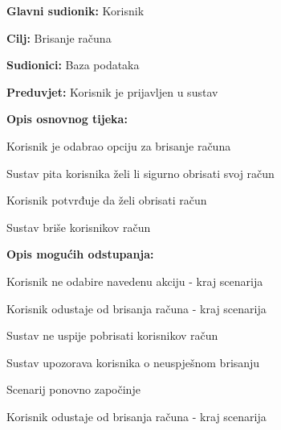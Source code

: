 					\noindent {}
					\begin{packed_item}
	
						\item \textbf{Glavni sudionik: }Korisnik
						\item  \textbf{Cilj:} Brisanje računa
						\item  \textbf{Sudionici:} Baza podataka
						\item  \textbf{Preduvjet:} Korisnik je prijavljen u sustav
						\item  \textbf{Opis osnovnog tijeka:}
						
						\item[] \begin{packed_enum}
							\item Korisnik je odabrao opciju za brisanje računa
							\item Sustav pita korisnika želi li sigurno obrisati svoj račun
							\item Korisnik potvrđuje da želi obrisati račun
							\item Sustav briše korisnikov račun
						\end{packed_enum}

						\item  \textbf{Opis mogućih odstupanja:}

						\item[] \begin{packed_item}
							\item[1.a] Korisnik ne odabire navedenu akciju - kraj scenarija
							\item[3.a] Korisnik odustaje od brisanja računa - kraj scenarija
							\item[4.a] Sustav ne uspije pobrisati korisnikov račun
							\item[] \begin{packed_enum}
								\item Sustav upozorava korisnika o neuspješnom brisanju
								\item
									\begin{packed_enum}
										\item Scenarij ponovno započinje
										\item Korisnik odustaje od brisanja računa - kraj scenarija
									\end{packed_enum}	
							\end{packed_enum}					
						\end{packed_item}
					\end{packed_item}	

